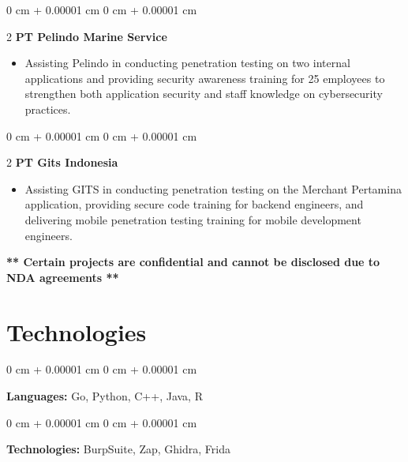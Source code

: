 \documentclass[10pt, letterpaper]{article}
\newenvironment{highlights}{
    \begin{itemize}[
        topsep=0.10 cm,
        parsep=0.10 cm,
        partopsep=0pt,
        itemsep=0pt,
        leftmargin=0 cm + 10pt
    ]
}{
    \end{itemize}
} %
\newenvironment{onecolentry}{
    \begin{adjustwidth}{
        0 cm + 0.00001 cm
    }{
        0 cm + 0.00001 cm
    }
}{
    \end{adjustwidth}
} %
\newenvironment{twocolentry}[2][]{
    \onecolentry
    \def\secondColumn{#2}
    \setcolumnwidth{\fill, 4.5 cm}
    \begin{paracol}{2}
}{
    \switchcolumn \raggedleft \secondColumn
    \end{paracol}
    \endonecolentry
} %
\begin{document}
\begin{samepage}
			
			
			\begin{twocolentry}{}{\textbf{PT Pelindo Marine Service}}
			\end{twocolentry}
			
			\begin{justify}
				\begin{highlights}
					\item Assisting Pelindo in conducting penetration testing on two internal applications and providing security awareness training for 25 employees to strengthen both application security and staff knowledge on cybersecurity practices.
				\end{highlights}
			\end{justify}
			
			
			
			\begin{twocolentry}{}{\textbf{PT Gits Indonesia}}
			\end{twocolentry}
			
			\begin{justify}
				\begin{highlights}
					\item Assisting GITS in conducting penetration testing on the Merchant Pertamina application, providing secure code training for backend engineers, and delivering mobile penetration testing training for mobile development engineers.
				\end{highlights}
				
			\end{justify}
			
			\vspace{0.3cm}
			\noindent \textbf{** Certain projects are confidential and cannot be disclosed due to NDA agreements **}
			
		\end{samepage}

		
    		\vspace{0.2cm}
    \section{Technologies}


 \vspace{0.35 cm}
        
        \begin{onecolentry}
            \textbf{Languages:} Go, Python, C++, Java, R
        \end{onecolentry}

        \vspace{0.2 cm}

        \begin{onecolentry}
            \textbf{Technologies:} BurpSuite, Zap, Ghidra, Frida
        \end{onecolentry}


    
\end{document}
